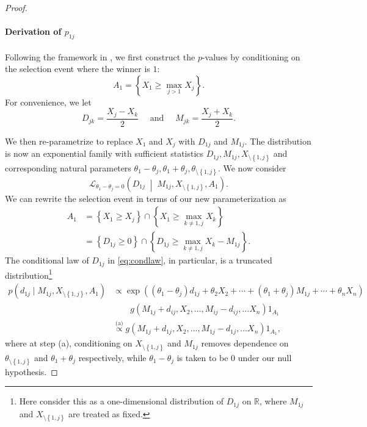 \documentclass[11pt]{article}
\theoremstyle{definition}
\theoremstyle{custom}
\newcommand{\RR}{\mathbb{R}}
\begin{document}
\begin{proof}
\paragraph{Derivation of $p_{1j}$}

Following the framework in \citet{Fithian:2014ws}, we first construct the $p$-values by conditioning on the selection event where the winner is $1$: 
\[A_1 = \left\{X_1 \ge \max_{j > 1} X_j\right\}.\]
For convenience, we let
\[D_{jk} = \frac{X_j - X_k}{2} \quad \text{ and } \quad M_{jk} = \frac{X_j + X_k}{2}.\]

We then re-parametrize to replace $X_1$ and $X_j$ with $D_{1j}$ and $M_{1j}$. The distribution is now an exponential family with sufficient statistics $D_{1j}, M_{1j}, X_{\setminus\left\{1, j\right\}}$ and corresponding natural parameters $\theta_1 - \theta_j, \theta_1 + \theta_j, \theta_{\setminus\left\{1, j\right\}}$. We now consider
\begin{equation}
\mathcal{L}_{\theta_1 - \theta_j = 0} \left(D_{1j} \;\middle|\; M_{1j}, X_{\setminus\left\{1, j\right\}}, A_1\right).
\label{eq:condlaw}
\end{equation}
We can rewrite the selection event in terms of our new parameterization as
\begin{align*}
A_1 &= \left\{X_1 \ge X_j\right\} \cap \left\{X_1 \ge \max_{k \neq 1,j} X_k\right\}\\
&= \left\{D_{1j} \ge 0\right\} \cap \left\{D_{1j} \ge \max_{k \ne 1, j} X_k - M_{1j}\right\}.
\end{align*}
The conditional law of $D_{1j}$ in \eqref{eq:condlaw}, in particular, is a truncated distribution\footnote{Here consider this as a one-dimensional distribution of $D_{1j}$ on $\RR$, where $M_{1j}$ and $X_{\setminus\left\{1, j\right\}}$ are treated as fixed.}
\begin{align*}
p\left(d_{1j} \mid M_{1j}, X_{\setminus\left\{1, j\right\}}, A_1\right) & \propto \exp\left(\left(\theta_1 - \theta_j\right) d_{1j} + \theta_2 X_2 + \cdots + \left(\theta_1 + \theta_j\right) M_{1j} + \cdots + \theta_n X_n \right) \\
& \quad\quad g\left(M_{1j} + d_{ij}, X_2, \ldots, M_{ij} - d_{ij}, \ldots X_n\right) 1_{A_1} \\
& \stackrel{\text{(a)}}{\propto} g\left(M_{1j} + d_{1j}, X_2, \ldots, M_{1j} - d_{1j}, \ldots X_n\right) 1_{A_1},
\end{align*}
where at step (a), conditioning on $X_{\setminus\left\{1, j\right\}}$ and $M_{1j}$ removes dependence on $\theta_{\setminus\left\{1, j\right\}}$ and $\theta_1 + \theta_j$ respectively, while $\theta_1 - \theta_j$ is taken to be $0$ under our null hypothesis.


\end{proof}
\end{document}

